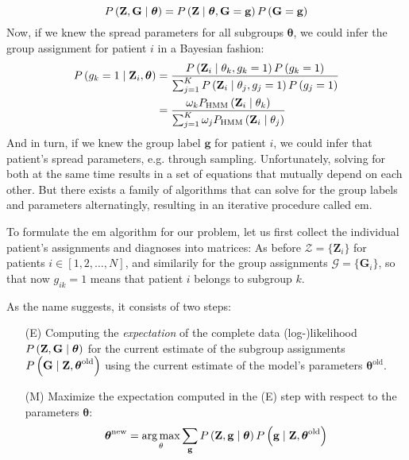 \documentclass[\relativeRoot/main.tex]{subfiles}
\begin{document}
%
\begin{equation}
    P \left( \mathbf{Z}, \mathbf{G} \mid \boldsymbol{\theta} \right) = P \left( \mathbf{Z} \mid \boldsymbol{\theta}, \mathbf{G} = \mathbf{g} \right) P \left(\mathbf{G} = \mathbf{g}\right)
\end{equation}
%
Now, if we knew the spread parameters for all subgroups $\boldsymbol{\theta}$, we could infer the group assignment for patient $i$ in a Bayesian fashion:
%
\begin{equation}
    \begin{aligned}
        P \left( g_k = 1 \mid \mathbf{Z}_i, \boldsymbol{\theta} \right) &= \frac{P \left( \mathbf{Z}_i \mid \theta_k, g_k=1 \right) P \left( g_k = 1 \right)}{\sum_{j=1}^K{P \left( \mathbf{Z}_i \mid \theta_j, g_j=1 \right) P \left( g_j = 1 \right)}} \\
        &= \frac{\omega_k P_\text{HMM} \left( \mathbf{Z}_i \mid \theta_k \right)}{\sum_{j=1}^K{\omega_j P_\text{HMM} \left( \mathbf{Z}_i \mid \theta_j \right)}}
    \end{aligned}
\end{equation}
%
And in turn, if we knew the group label $\mathbf{g}$ for patient $i$, we could infer that patient's spread parameters, e.g. through sampling. Unfortunately, solving for both at the same time results in a set of equations that mutually depend on each other. But there exists a family of algorithms that can solve for the group labels and parameters alternatingly, resulting in an iterative procedure called \gls{em}.

To formulate the \gls{em} algorithm for our problem, let us first collect the individual patient's assignments and diagnoses into matrices: As before $\boldsymbol{\mathcal{Z}} = \{ \mathbf{Z}_i \}$ for patients $i \in \left[ 1, 2, \ldots, N \right]$, and similarily for the group assignments $\boldsymbol{\mathcal{G}} = \{ \mathbf{G}_i \}$, so that now $g_{ik} = 1$ means that patient $i$ belongs to subgroup $k$.

As the name suggests, it consists of two steps:
\begin{enumerate}
    \item[(E)] Computing the \emph{expectation} of the complete data (log-)likelihood $P \left( \mathbf{Z}, \mathbf{G} \mid \boldsymbol{\theta} \right)$ for the current estimate of the subgroup assignments $P \left( \mathbf{G} \mid \mathbf{Z}, \boldsymbol{\theta}^\text{old} \right)$ using the current estimate of the model's parameters $\boldsymbol{\theta}^\text{old}$.
    \item[(M)] Maximize the expectation computed in the (E) step with respect to the parameters $\boldsymbol{\theta}$:
    \begin{equation}
        \boldsymbol{\theta}^\text{new} = \operatorname*{arg\,max}_\theta{\sum_{\mathbf{g}}{P \left( \mathbf{Z}, \mathbf{g} \mid \boldsymbol{\theta} \right) P \left( \mathbf{g} \mid \mathbf{Z}, \boldsymbol{\theta}^\text{old} \right)}}
    \end{equation}
\end{enumerate}
\end{document}
